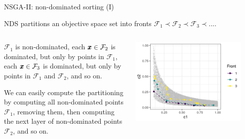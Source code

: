 \documentclass[11pt,compress,t,notes=noshow,xcolor=table]{beamer}
\newcommand{\xx}{\conf}     %
\begin{document}
\begin{vbframe}{NSGA-II: non-dominated sorting (I)}

NDS partitions an objective space set into fronts $\mathcal{F}_1 \prec \mathcal{F}_2 \prec \mathcal{F}_3 \prec ... $.

\begin{columns}
\begin{column}{0.4\textwidth}
\begin{itemize}{\small
    \item $\mathcal{F}_1$ is non-dominated, 
      each $\xx \in \mathcal{F}_2$ is dominated, but only by points in $\mathcal{F}_1$, 
      each $\xx \in \mathcal{F}_3$ is dominated, but only by points in $\mathcal{F}_1$ and $\mathcal{F}_2$, 
      and so on. 
    \item We can easily compute the partitioning by computing all non-dominated points  $\mathcal{F}_1$,
        removing them, then computing the next layer of non-dominated points $\mathcal{F}_2$, and so on.}
\end{itemize}
\end{column}

\begin{column}{0.6\textwidth}
\begin{center}
\includegraphics[width = 0.9\textwidth]{slides/11-multicrit/figure_man/NSGA2_NDS.png}
\end{center}
\end{column}
\end{columns}

\end{vbframe}
\end{document}
